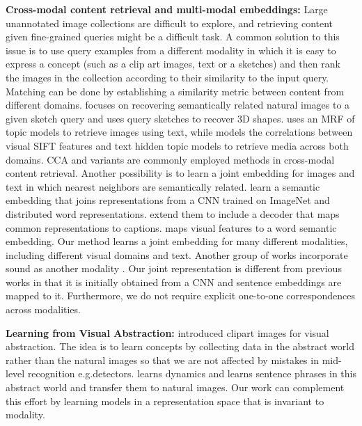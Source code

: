 \documentclass[10pt,journal,compsoc]{IEEEtran}
\begin{document}
	\textbf{Cross-modal content retrieval and multi-modal embeddings:}
		Large unannotated image collections are difficult to explore, and retrieving content given fine-grained queries might be a difficult task. A common solution to this issue  is to use query examples from a different modality in which it is easy to express a concept (such as a clip art images, text or a sketches) and then rank the images in the collection according to their similarity to the input query. Matching can be done by establishing a similarity metric between content from different domains. \cite{eitz2011sketch} focuses on recovering semantically related natural images to a given sketch query and \cite{wang2015sketch} uses query sketches to recover 3D shapes. \cite{jia2011learning} uses an MRF of topic models to retrieve images using text, while \cite{rasiwasia2010new} models the correlations between visual SIFT features and text hidden topic models to retrieve media across both domains. CCA \cite{hardoon2004canonical} and variants \cite{rasiwasia2014cluster} are commonly employed methods in cross-modal content retrieval. Another possibility is to learn a joint embedding for images and text in which nearest neighbors are semantically related. \cite{frome2013devise, norouzi2013zero} learn a semantic embedding that joins representations from a CNN trained on ImageNet and distributed word representations. \cite{kiros2014unifying, xu2015show} extend them to include a decoder that maps common representations to captions. \cite{socher2013zero} maps visual features to a word semantic embedding. Our method learns a joint embedding for many different modalities, including different visual domains and text. Another group of works incorporate sound as another modality \cite{ngiam2011multimodal,owens2015visually}. Our joint representation is different from previous works in that it is initially obtained from a CNN and sentence embeddings are mapped to it. Furthermore, we do not require explicit one-to-one correspondences across modalities.
    
    \textbf{Learning from Visual Abstraction:}
        \cite{zitnick2013bringing} introduced clipart images for visual abstraction. The idea is to learn concepts by collecting data in the abstract world rather than the natural images so that we are not affected by mistakes in mid-level recognition e.g.\object detectors. \cite{fouhey2014predicting} learns dynamics and \cite{zitnick2013learning} learns sentence phrases in this abstract world and transfer them to natural images. Our work can complement this effort by learning models in a representation space that is invariant to modality.
        
\end{document}
